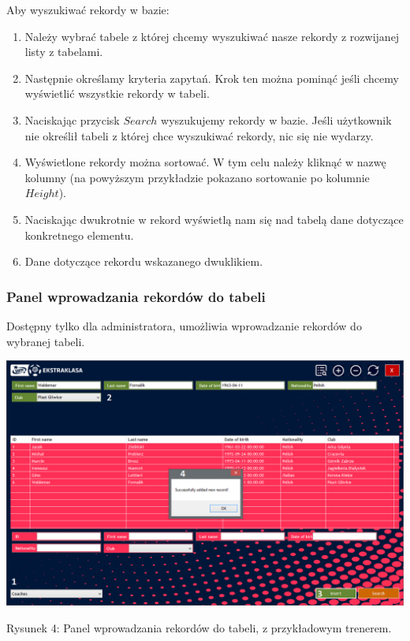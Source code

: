 \documentclass[12pt,a4paper]{article}
\begin{document}
    Aby wyszukiwać rekordy w bazie:
    \begin{enumerate}
        \item Należy wybrać tabele z której chcemy wyszukiwać nasze rekordy z rozwijanej listy z tabelami.
        \item Następnie określamy kryteria zapytań. Krok ten można pominąć jeśli chcemy wyświetlić wszystkie rekordy w tabeli.
        \item Naciskając przycisk $Search$ wyszukujemy rekordy w bazie. Jeśli użytkownik nie określił tabeli z której chce wyszukiwać rekordy, nic się nie wydarzy.
        \item Wyświetlone rekordy można sortować. W tym celu należy kliknąć w nazwę kolumny (na powyższym przykładzie pokazano sortowanie po kolumnie $Height$).
        \item Naciskając dwukrotnie w rekord wyświetlą nam się nad tabelą dane dotyczące konkretnego elementu.
        \item Dane dotyczące rekordu wskazanego dwuklikiem.
    \end{enumerate}

    \newpage

    \subsubsection{Panel wprowadzania rekordów do tabeli}
    Dostępny tylko dla administratora, umożliwia wprowadzanie rekordów do wybranej tabeli.
    \begin{center}
        \includegraphics[scale=0.47]{insert-panel.png}
        \begin{flushleft}
            \begin{scriptsize}
            \begin{list}{}{\leftmargin=13.5em}\raggedright\item\relax
            Rysunek 4: Panel wprowadzania rekordów do tabeli, z przykładowym trenerem.
            \end{list}
            \end{scriptsize}
        \end{flushleft}
    \end{center}
\end{document}
